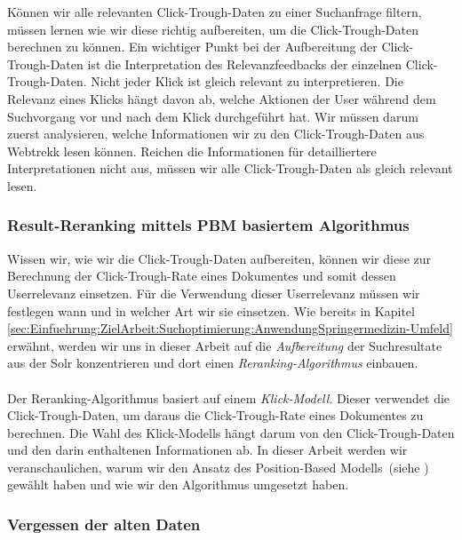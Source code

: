 Können wir alle relevanten Click-Trough-Daten zu einer Suchanfrage filtern, müssen lernen wie wir diese richtig aufbereiten, um die Click-Trough-Daten berechnen zu können.  Ein wichtiger Punkt bei der Aufbereitung der Click-Trough-Daten ist die Interpretation des Relevanzfeedbacks der einzelnen Click-Trough-Daten. Nicht jeder Klick ist gleich relevant zu interpretieren. Die Relevanz eines Klicks hängt davon ab, welche Aktionen der User während dem Suchvorgang vor und nach dem Klick durchgeführt hat. Wir müssen darum zuerst analysieren, welche Informationen wir zu den Click-Trough-Daten aus Webtrekk lesen können.  Reichen die Informationen für detailliertere Interpretationen nicht aus, müssen wir alle Click-Trough-Daten als gleich relevant lesen.

\subsubsection{Result-Reranking mittels PBM basiertem Algorithmus}
\label{sec:Einfuehrung:Methodik:Result-RerankingPBM}

Wissen wir, wie wir die Click-Trough-Daten aufbereiten, können wir diese zur Berechnung der Click-Trough-Rate eines Dokumentes und somit dessen Userrelevanz einsetzen. Für die Verwendung dieser Userrelevanz müssen wir festlegen wann und in welcher Art wir sie einsetzen. Wie bereits in Kapitel \ref{sec:Einfuehrung:ZielArbeit:Suchoptimierung:AnwendungSpringermedizin-Umfeld} erwähnt, werden wir uns in dieser Arbeit auf die \textit{Aufbereitung} der Suchresultate aus der Solr konzentrieren und dort einen \textit{Reranking-Algorithmus} einbauen. 
\\
\\
Der Reranking-Algorithmus basiert auf einem \textit{Klick-Modell}. Dieser verwendet die Click-Trough-Daten, um daraus die Click-Trough-Rate eines Dokumentes zu berechnen. Die Wahl des Klick-Modells hängt darum von den Click-Trough-Daten und den darin enthaltenen Informationen ab. In dieser Arbeit werden wir veranschaulichen, warum wir den Ansatz des Position-Based Modells~(siehe \cite{pbm}) gewählt haben und wie wir den Algorithmus umgesetzt haben.

\subsubsection{Vergessen der alten Daten}
\label{sec:Einfuehrung:Vergessen}

